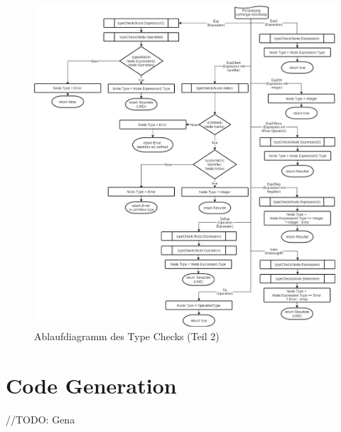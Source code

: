 \documentclass[
a4paper
]{scrreprt}
\begin{document}
\begin{figure}[htbp]
\centering
\includegraphics[width=\textwidth]{./images/TypeCheck2.png}
\caption{Ablaufdiagramm des Type Checks (Teil 2)}
\label{TypeCheck2}
\end{figure}


\section{Code Generation}
//TODO: Gena
\end{document}
